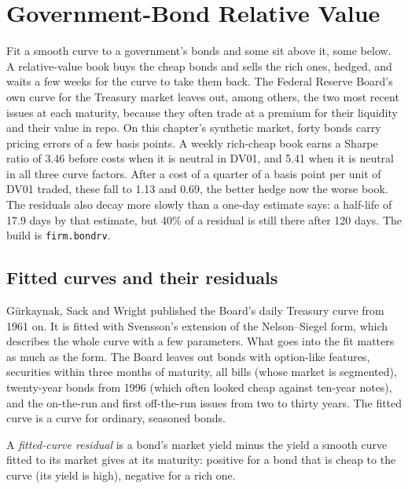 \chapter{Government-Bond Relative Value}\label{ch:s2:government-bond-relative-value}

Fit a smooth curve to a government's bonds and some sit above it, some below. A relative-value book buys the cheap bonds and sells the rich ones,
hedged, and waits a few weeks for the curve to take them back. The Federal Reserve Board's own curve for the Treasury market leaves out, among others,
the two most recent issues at each maturity, because they often trade at a premium for their liquidity and their value in repo. On this chapter's
synthetic market, forty bonds carry pricing errors of a few basis points. A weekly rich-cheap book earns a Sharpe ratio of 3.46 before costs when it
is neutral in DV01, and 5.41 when it is neutral in all three curve factors. After a cost of a quarter of a basis point per unit of DV01 traded, these
fall to 1.13 and 0.69, the better hedge now the worse book. The residuals also decay more slowly than a one-day estimate says: a half-life of 17.9
days by that estimate, but 40\% of a residual is still there after 120 days. The build is \texttt{firm.bondrv}.

\section{Fitted curves and their residuals}

Gürkaynak, Sack and Wright published the Board's daily Treasury curve from 1961 on. It is fitted with Svensson's extension of the Nelson--Siegel form,
which describes the whole curve with a few parameters. What goes into the fit matters as much as the form. The Board leaves out bonds with option-like
features, securities within three months of maturity, all bills (whose market is segmented), twenty-year bonds from 1996 (which often looked cheap
against ten-year notes), and the on-the-run and first off-the-run issues from two to thirty years. The fitted curve is a curve for ordinary, seasoned
bonds.

\begin{definition}\label{def:s2:government-bond-relative-value:residual}
A \emph{fitted-curve residual} is a bond's market yield minus the yield a smooth curve fitted to its market gives at its
maturity: positive for a bond that is cheap to the curve (its yield is high), negative for a rich one.
\end{definition}

